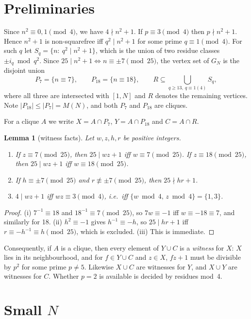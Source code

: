 \documentclass[11pt]{amsart}
\newtheorem{lemma}[theorem]{Lemma}
\theoremstyle{definition}
\theoremstyle{remark}
\begin{document}
\section{Preliminaries}\label{sec:prelim}

Since $n^2\equiv 0,1\pmod 4$, we have $4\nmid n^2+1$. If $p\equiv3\pmod4$ then $p\nmid n^2+1$. Hence $n^2+1$ is
non-squarefree iff $q^2\mid n^2+1$ for some prime $q\equiv1\pmod4$. For such $q$ let
$S_q=\{n:\ q^2\mid n^2+1\}$, which is the union of two residue classes $\pm i_q\bmod q^2$. Since
$25\mid n^2+1\iff n\equiv\pm7\pmod{25}$, the vertex set of $G_N$ is the disjoint union
\[
  P_7=\{n\equiv7\},\qquad P_{18}=\{n\equiv18\},\qquad R\subseteq \bigcup_{q\ge13,\ q\equiv1(4)} S_q,
\]
where all three are intersected with $[1,N]$ and $R$ denotes the remaining vertices. Note
$|P_{18}|\le|P_7|=M(N)$, and both $P_7$ and $P_{18}$ are cliques.

For a clique $A$ we write $X=A\cap P_7$, $Y=A\cap P_{18}$ and $C=A\cap R$.

\begin{lemma}[witness facts]\label{lem:witness}
Let $w,z,h,r$ be positive integers.
\begin{enumerate}[label=(\roman*)]
\item If $z\equiv7\pmod{25}$, then $25\mid wz+1$ iff $w\equiv7\pmod{25}$. If $z\equiv18\pmod{25}$, then
  $25\mid wz+1$ iff $w\equiv18\pmod{25}$.
\item If $h\equiv\pm7\pmod{25}$ and $r\not\equiv\pm7\pmod{25}$, then $25\nmid hr+1$.
\item $4\mid wz+1$ iff $wz\equiv3\pmod 4$, i.e.\ iff $\{w\bmod4,\,z\bmod4\}=\{1,3\}$.
\end{enumerate}
\end{lemma}
\begin{proof}
(i) $7^{-1}\equiv18$ and $18^{-1}\equiv7\pmod{25}$, so $7w\equiv-1$ iff $w\equiv-18\equiv7$, and similarly for
18. (ii) $h^2\equiv-1$ gives $h^{-1}\equiv-h$, so $25\mid hr+1$ iff $r\equiv-h^{-1}\equiv h\pmod{25}$, which is
excluded. (iii) This is immediate.
\end{proof}

Consequently, if $A$ is a clique, then every element of $Y\cup C$ is a \emph{witness} for $X$: $X$ lies in
its neighbourhood, and for $f\in Y\cup C$ and $z\in X$, $fz+1$ must be divisible by $p^2$ for some prime
$p\ne5$. Likewise $X\cup C$ are witnesses for $Y$, and $X\cup Y$ are witnesses for $C$. Whether $p=2$ is
available is decided by residues mod~4.

\section{Small \texorpdfstring{$N$}{N}}\label{sec:small}
\end{document}
